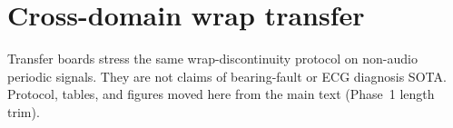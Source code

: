 \section{Cross-domain wrap transfer}
\label{app:transfer-bundle}

Transfer boards stress the same wrap-discontinuity protocol on non-audio periodic signals.
They are not claims of bearing-fault or ECG diagnosis SOTA.
Protocol, tables, and figures moved here from the main text (Phase~1 length trim).



